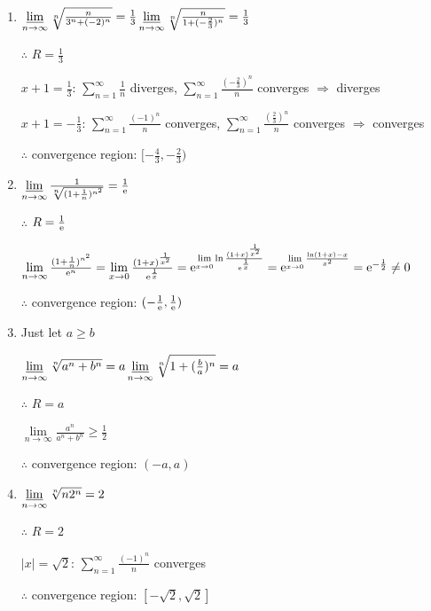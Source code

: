 \begin{enumerate}[1]
\begin{enumerate}[(1)]
        \item
        $\varliminf\limits_{n\rightarrow{\infty}} \sqrt[n]{\frac{n}{3^n+(-2)^n}}=\frac{1}{3}\varliminf\limits_{n\rightarrow{\infty}}\sqrt[n]{\frac{n}{1+(-\frac{2}{3})^n}}=\frac{1}{3}$
        \par $\therefore$ $R=\frac{1}{3}$
        \par $x+1=\frac{1}{3}$: $\sum\limits_{n=1}^\infty \frac{1}{n}$ diverges, $\sum\limits_{n=1}^\infty \frac{(-\frac{2}{3})^n}{n}$ converges $\Rightarrow$ diverges
        \par $x+1=-\frac{1}{3}$: $\sum\limits_{n=1}^\infty \frac{(-1)^n}{n}$ converges, $\sum\limits_{n=1}^\infty \frac{(\frac{2}{3})^n}{n}$ converges $\Rightarrow$ converges
        \par $\therefore$ convergence region: $[-\frac{4}{3},-\frac{2}{3})$

        \item
        $\varliminf\limits_{n\rightarrow{\infty}} \frac{1}{\sqrt[n]{(1+\frac{1}{n})^{n^2}}}=\frac{1}{\mathrm{e}}$
        \par $\therefore$ $R=\frac{1}{\mathrm{e}}$
        \par $\lim\limits_{n\rightarrow{\infty}} \frac{(1+\frac{1}{n})^{n^2}}{\mathrm{e}^n}=\lim\limits_{x\rightarrow{0}} \frac{(1+x)^{\frac{1}{x^2}}}{\mathrm{e}^{\frac{1}{x}}}=\mathrm{e}^{\lim\limits_{x\rightarrow{0}} \ln \frac{(1+x)^{\frac{1}{x^2}}}{\mathrm{e}^{\frac{1}{x}}}}=\mathrm{e}^{\lim\limits_{x\rightarrow{0}}\frac{ \ln (1+x)-x}{x^2}}=\mathrm{e}^{-\frac{1}{2}}\neq 0$
        \par $\therefore$ convergence region: $(-\frac{1}{\mathrm{e}},\frac{1}{\mathrm{e}})$

        \item
        Just let $a\geqslant b$
        \par $\varliminf\limits_{n\rightarrow{\infty}} \sqrt[n]{a^n+b^n}=a\varliminf\limits_{n\rightarrow{\infty}}\sqrt[n]{1+(\frac{b}{a})^n}=a$
        \par $\therefore$ $R=a$
        \par $\lim\limits_{n\rightarrow{\infty}} \frac{a^n}{a^n+b^n}\geqslant \frac{1}{2}$
        \par $\therefore$ convergence region: $(-a,a)$

        \item
        $\varliminf\limits_{n\rightarrow{\infty}} \sqrt[n]{n2^n}=2$
        \par $\therefore$ $R=2$
        \par $|x|=\sqrt{2}$: $\sum\limits_{n=1}^\infty \frac{(-1)^n}{n}$ converges
        \par $\therefore$ convergence region: $[-\sqrt{2},\sqrt{2}]$


\end{enumerate}
\end{enumerate}
